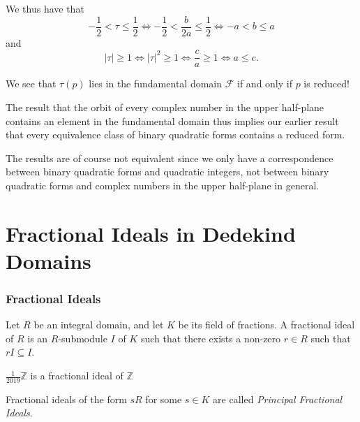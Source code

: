 \documentclass[handout]{beamer}
\begin{document}
\begin{frame}
	We thus have that
	\[
		-\frac{1}{2} < \tau \leq \frac{1}{2} \iff -\frac{1}{2} < \frac{b}{2a} \leq \frac{1}{2} \iff -a < b \leq a
	\]
	and
	\[
		|\tau| \geq 1 \iff {|\tau|}^2 \geq 1 \iff \frac{c}{a} \geq 1 \iff a \leq c.
	\]
	\pause

	We see that $\tau(p)$ lies in the fundamental domain $\mathcal{F}$ if and only if $p$ is reduced! \pause
	
	The result that the orbit of every complex number in the upper half-plane contains an element in the fundamental domain thus implies our earlier result that every equivalence class of binary quadratic forms contains a reduced form. \pause
	
	The results are of course not equivalent since we only have a correspondence between binary quadratic forms and quadratic integers, not between binary quadratic forms and complex numbers in the upper half-plane in general.
\end{frame}

\section{Fractional Ideals in Dedekind Domains}

\begin{frame}

	\frametitle{Fractional Ideals}

	\begin{definition}
		Let $R$ be an integral domain, and let $K$ be its field of fractions. A fractional ideal of $R$ is an $R$-submodule $I$ of $K$ such that there exists a non-zero $r \in R$ such that $rI \subseteq I$.
	\end{definition}
	\pause

	\begin{example}
		$\frac{1}{2019} \mathbb{Z}$ is a fractional ideal of $\mathbb{Z}$
	\end{example}
	\pause

	\begin{definition}
		Fractional ideals of the form $sR$ for some $s \in K$ are called \emph{Principal Fractional Ideals}.
	\end{definition}

\end{frame}
\end{document}
